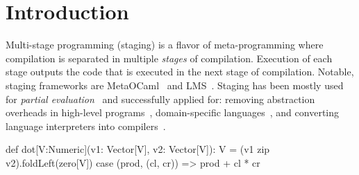 \section{Introduction}
\label{sct:introduction}


 Multi-stage programming (staging) is a flavor of meta-programming where compilation is
  separated in multiple \emph{stages} of compilation. Execution of each stage outputs
  the code that is executed in the next stage of compilation. Notable, staging frameworks
  are MetaOCaml~\cite{taha_multi-stage_1997} and LMS~\cite{rompf2012lightweight}.
  Staging has been mostly used for \emph{partial evaluation}~\cite{jones1993partial}
  and successfully applied for: removing abstraction overheads in high-level
  programs~\cite{carette2005multi,rompf2012lightweight}, domain-specific
  languages~\cite{jonnalagedda2014staged}, and converting language
  interpreters into compilers~\cite{futamura1999partial,lancet}.





\begin{lstparagraph}
  def dot[V:Numeric](v1: Vector[V], v2: Vector[V]): V =
    (v1 zip v2).foldLeft(zero[V]){ case (prod, (cl, cr)) =>
      prod + cl * cr
    }
 \end{lstparagraph}


